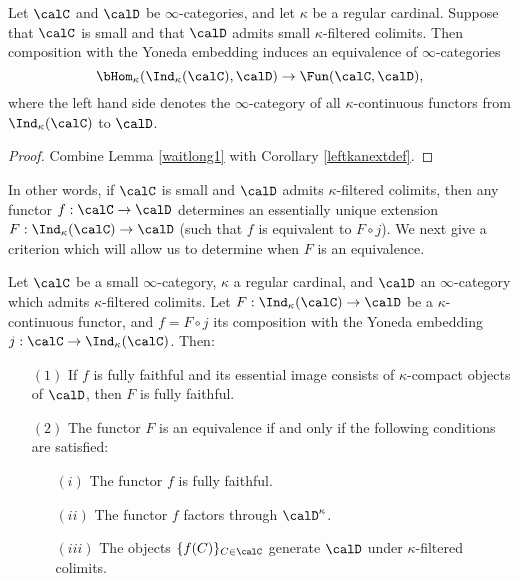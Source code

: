 \begin{proposition}\label{intprop}
Let $\calC$ and $\calD$ be $\infty$-categories, and let $\kappa$ be a regular cardinal.
Suppose that $\calC$ is small and that $\calD$ admits small $\kappa$-filtered colimits.
Then composition with the Yoneda embedding induces an equivalence of $\infty$-categories
$$ \bHom_{\kappa}( \Ind_{\kappa}(\calC), \calD) \rightarrow \Fun(\calC, \calD),$$
where the left hand side denotes the $\infty$-category of all $\kappa$-continuous functors
from $\Ind_{\kappa}(\calC)$ to $\calD$.
\end{proposition}

\begin{proof}
Combine Lemma \ref{waitlong1} with Corollary \ref{leftkanextdef}.
\end{proof}

In other words, if $\calC$ is small and $\calD$ admits $\kappa$-filtered colimits, then any
functor $f: \calC \rightarrow \calD$ determines an essentially unique extension
$F: \Ind_{\kappa}(\calC) \rightarrow \calD$ (such that $f$ is equivalent to $F \circ j$).
We next give a criterion which will allow us to determine when $F$ is an equivalence.

\begin{proposition}\label{uterr}
Let $\calC$ be a small $\infty$-category, $\kappa$ a regular cardinal, and $\calD$ an $\infty$-category which admits $\kappa$-filtered colimits. Let $F: \Ind_{\kappa}(\calC) \rightarrow \calD$
be a $\kappa$-continuous functor, and $f = F \circ j$ its composition with the Yoneda embedding $j: \calC \rightarrow \Ind_{\kappa}(\calC)$. Then:
\begin{itemize}
\item[$(1)$] If $f$ is fully faithful and its essential image consists of $\kappa$-compact objects of $\calD$, then $F$ is fully faithful.
\item[$(2)$] The functor $F$ is an equivalence if and only if the following conditions are satisfied:
\begin{itemize}
\item[$(i)$] The functor $f$ is fully faithful.
\item[$(ii)$] The functor $f$ factors through $\calD^{\kappa}$. 
\item[$(iii)$] The objects $\{ f(C) \}_{C \in \calC}$ generate $\calD$ under $\kappa$-filtered colimits.
\end{itemize}
\end{itemize}
\end{proposition}

